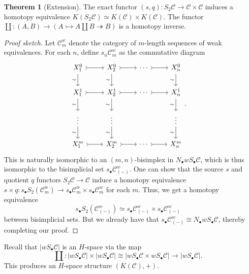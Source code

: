 \documentclass[10pt,letterpaper,cm]{nupset}
\theoremstyle{definition}
\theoremstyle{theorem}
\newtheorem{theorem}[definition]{Theorem}
\theoremstyle{remark}
\newcommand{\1}{\mathbf{1}}
\renewcommand{\c}{\mathscr{C}}
\newcommand{\0}{\vec 0}
\begin{document}
\begin{theorem}[Extension]\label{ext}
The exact functor $(s, q) : S_2{\c} \to \c \times \c$ induces  a homotopy equivalence $K(S_2{\c}) \simeq K(\c) \times K(\c)$. The functor $\coprod : \left(A, B\right) \to \left(A \rightarrowtail A \coprod B \twoheadrightarrow  B\right)$ is a homotopy inverse.
\end{theorem}
\begin{proof}[Proof sketch]
Let $\c^w_m$ denote the category of $m$-length sequences of weak equivalences. For each $n$, define $s_n\c^w_m$ as the commutative diagram
\[
\begin{tikzcd}
 X_1^0 \arrow[d, "\sim"'] \arrow[r, tail] & X_2^0 \arrow[r, tail] \arrow[d, "\sim"'] & \cdots \arrow[r, tail] & X_n^0 \arrow[d, "\sim"'] \\
X_1^1 \arrow[d, "\sim"'] \arrow[r, tail] & X_2^1 \arrow[r, tail] \arrow[d, "\sim"'] & \cdots \arrow[r, tail] & X_n^1 \arrow[d, "\sim"'] \\
  \vdots \arrow[d, "\sim"'] & \vdots \arrow[d, "\sim"'] &  & \vdots \arrow[d, "\sim"'] \\
 X_1^m \arrow[r, tail] & X_2^m \arrow[r, tail] & \cdots \arrow[r, tail] & X_n^m
\end{tikzcd}
.\]
This is naturally isomorphic to an $(m, n)$-bisimplex in $N_{\bullet}w S_{\bullet}\c$, which is thus isomorphic to the bisimplicial set $s_{\bullet}\c^w_{(-)}$. One can show that the source $s$ and quotient $q$ functors  $S_2{\c} \to \c$ induce a homotopy equivalence $s \times q : s_{\bullet}S_2(\c^w_m) \to s_{\bullet}\c^w_m \times s_{\bullet}\c^w_m$ for each $m$. Thus, we get a homotopy equivalence  $$s_{\bullet}S_2(\c^w_{(-)}) \simeq s_{\bullet}\c^w_{(-)} \times s_{\bullet}\c^w_{(-)}$$ between bisimplicial sets. But we already have that $s_{\bullet}\c^w_{(-)} \cong N_{\bullet}w S_{\bullet}\c$, thereby completing our proof.
\end{proof}

\bigskip

Recall that $\left\lvert{wS_{\bullet} \c}\right\rvert$ is an $H$-space via the map 
\[ \label{eqn:HS} \coprod: \left\lvert{wS_{\bullet} \c}\right\rvert \times \left\lvert{wS_{\bullet} \c}\right\rvert \cong \left\lvert{wS_{\bullet} \c \times  wS_{\bullet} \c}\right\rvert\to \left\lvert{wS_{\bullet} \c}\right\rvert.
\tag{$\star$}\] This produces an $H$-space structure $\left(K(\c), +\right)$.

   {\bigRelbar\bigRelbar{\bigtwoarrowsleft\rightarrow\rightarrow}}
\end{document}
